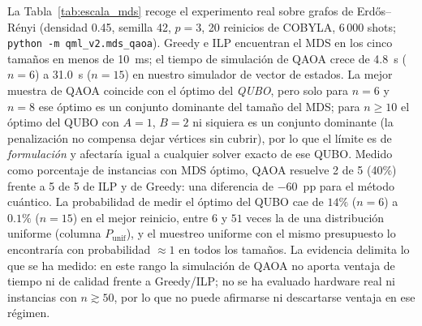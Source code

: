 La Tabla~\ref{tab:escala_mds} recoge el experimento real sobre grafos de Erdős--Rényi (densidad 0.45, semilla 42, $p=3$, 20 reinicios de COBYLA, 6\,000 shots; \texttt{python -m qml\_v2.mds\_qaoa}). Greedy e ILP encuentran el MDS en los cinco tamaños en menos de 10~ms; el tiempo de simulación de QAOA crece de 4.8~s ($n=6$) a 31.0~s ($n=15$) en nuestro simulador de vector de estados. La mejor muestra de QAOA coincide con el óptimo del \emph{QUBO}, pero solo para $n=6$ y $n=8$ ese óptimo es un conjunto dominante del tamaño del MDS; para $n\ge 10$ el óptimo del QUBO con $A=1$, $B=2$ ni siquiera es un conjunto dominante (la penalización no compensa dejar vértices sin cubrir), por lo que el límite es de \emph{formulación} y afectaría igual a cualquier solver exacto de ese QUBO. Medido como porcentaje de instancias con MDS óptimo, QAOA resuelve 2 de 5 (40\%) frente a 5 de 5 de ILP y de Greedy: una diferencia de $-60$~pp para el método cuántico. La probabilidad de medir el óptimo del QUBO cae de $14\%$ ($n=6$) a $0.1\%$ ($n=15$) en el mejor reinicio, entre $6$ y $51$ veces la de una distribución uniforme (columna $P_{\mathrm{unif}}$), y el muestreo uniforme con el mismo presupuesto lo encontraría con probabilidad $\approx 1$ en todos los tamaños. La evidencia delimita lo que se ha medido: en este rango la simulación de QAOA no aporta ventaja de tiempo ni de calidad frente a Greedy/ILP; no se ha evaluado hardware real ni instancias con $n\gtrsim 50$, por lo que no puede afirmarse ni descartarse ventaja en ese régimen.

\begin{table}[ht]
\centering
\footnotesize
\setlength{\tabcolsep}{4pt}
\caption{Escalabilidad real del Caso~7 (ER, densidad 0.45). ILP y Greedy: tamaño del conjunto dominante hallado. Mejor muestra QAOA: tamaño del conjunto con menor coste QUBO entre las muestras de los 20 reinicios y si es dominante. $P_{\max}(\text{opt})$: mayor probabilidad exacta de medir el óptimo del QUBO entre 20 reinicios con $p=3$; $P_{\text{unif}}$: probabilidad del óptimo bajo una distribución uniforme (referencia nula); $t_{\text{QAOA}}$: tiempo de los 20 reinicios (simulación NumPy). Fuente: \texttt{10\_mds\_qaoa\_escalabilidad.csv}.}
\label{tab:escala_mds}
\end{table}

